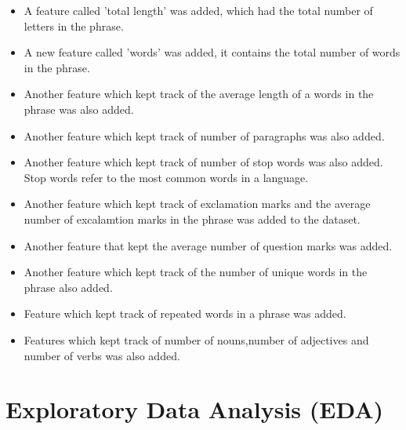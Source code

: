 \documentclass[12pt]{article}
\begin{document}
\begin{itemize}
    \item A feature called 'total length' was added, which had the total number of letters in the phrase.

\item A new feature called 'words' was added, it contains the total number of words in the phrase.
\item Another feature which kept track of the average length of a words in the phrase was also added.
\item Another feature which kept track of number of paragraphs was also added.
\item Another feature which kept track of number of stop words was also added. Stop words refer to the most common words in a language.
\item Another feature which kept track of exclamation marks and the average number of excalamtion marks in the phrase was added to the dataset.
\item Another feature that kept the average number of question marks was added.
\item Another feature which kept track of the number of unique words in the phrase also added.
\item Feature which kept track of repeated words in a phrase was added.
\item Features which kept track of number of nouns,number of adjectives and number of verbs was also added.
\end{itemize}

\section{Exploratory Data Analysis (EDA)}
\end{document}
